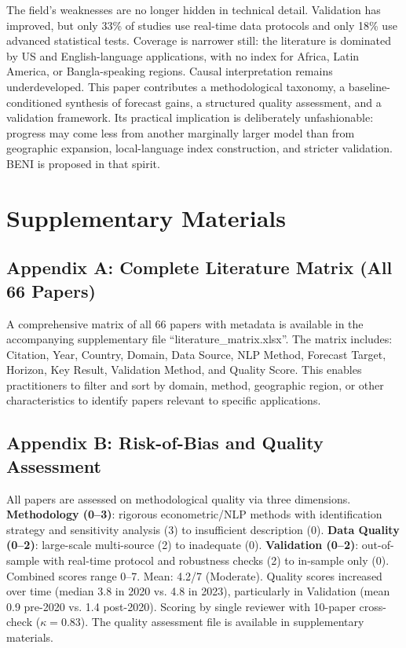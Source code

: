 \documentclass[12pt,oneside]{article}
\begin{document}
The field's weaknesses are no longer hidden in technical detail. Validation has improved, but only 33\% of studies use real-time data protocols and only 18\% use advanced statistical tests. Coverage is narrower still: the literature is dominated by US and English-language applications, with no index for Africa, Latin America, or Bangla-speaking regions. Causal interpretation remains underdeveloped. This paper contributes a methodological taxonomy, a baseline-conditioned synthesis of forecast gains, a structured quality assessment, and a validation framework. Its practical implication is deliberately unfashionable: progress may come less from another marginally larger model than from geographic expansion, local-language index construction, and stricter validation. BENI is proposed in that spirit.

\appendix

\section{Supplementary Materials}

\subsection*{Appendix A: Complete Literature Matrix (All 66 Papers)}

A comprehensive matrix of all 66 papers with metadata is available in the accompanying supplementary file ``literature\_matrix.xlsx''. The matrix includes: Citation, Year, Country, Domain, Data Source, NLP Method, Forecast Target, Horizon, Key Result, Validation Method, and Quality Score. This enables practitioners to filter and sort by domain, method, geographic region, or other characteristics to identify papers relevant to specific applications.

\subsection*{Appendix B: Risk-of-Bias and Quality Assessment}

All papers are assessed on methodological quality via three dimensions. \textbf{Methodology (0--3)}: rigorous econometric/NLP methods with identification strategy and sensitivity analysis (3) to insufficient description (0). \textbf{Data Quality (0--2)}: large-scale multi-source (2) to inadequate (0). \textbf{Validation (0--2)}: out-of-sample with real-time protocol and robustness checks (2) to in-sample only (0). Combined scores range 0--7. Mean: 4.2/7 (Moderate). Quality scores increased over time (median 3.8 in 2020 vs. 4.8 in 2023), particularly in Validation (mean 0.9 pre-2020 vs. 1.4 post-2020). Scoring by single reviewer with 10-paper cross-check ($\kappa = 0.83$). The quality assessment file is available in supplementary materials.
\end{document}
